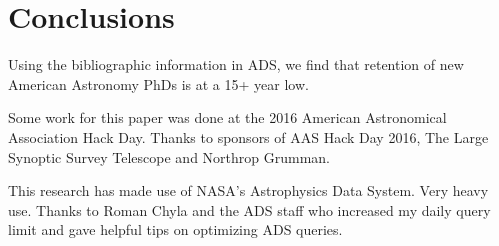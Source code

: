 \documentclass[preprint2]{aastex}
\begin{document}
\section{Conclusions}
Using the bibliographic information in ADS, we find that retention of new American Astronomy PhDs is at a 15+ year low.  


\acknowledgments
Some work for this paper was done at the 2016 American Astronomical Association Hack Day. Thanks to sponsors of AAS Hack Day 2016, The Large Synoptic Survey Telescope and Northrop Grumman.

This research has made use of NASA's Astrophysics Data System. Very heavy use. Thanks to Roman Chyla and the ADS staff who increased my daily query limit and gave helpful tips on optimizing ADS queries.





\end{document}
